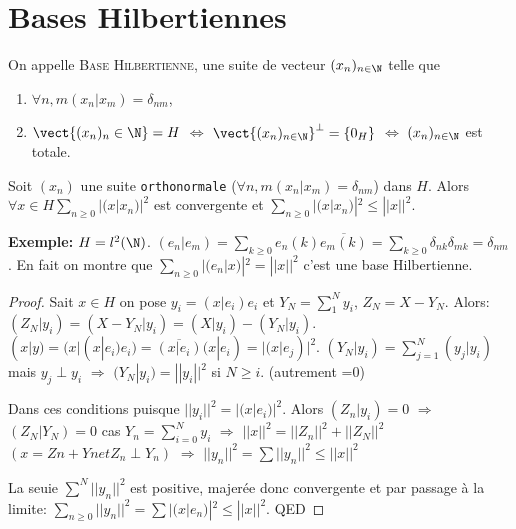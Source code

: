 \section{Bases Hilbertiennes} %

\begin{definition}
	On appelle \textsc{Base Hilbertienne}, une suite de vecteur $(x_n)_{n\in \N}$ telle que 
	\begin{enumerate}
		\item $\forall n, m (x_n|x_m)=δ_{nm}$,
		\item $\vect\{(x_n)_n\in\N\}=H$ $\Leftrightarrow$ $\vect{(x_n)_{n\in \N}}^\perp=\{0_H\}$ $\Leftrightarrow$ $(x_n)_{n\in \N}$ est totale.
	\end{enumerate}
\end{definition}

\begin{theorem}
	Soit $(x_n)$ une suite \texttt{orthonormale} ($\forall n, m (x_n|x_m)=δ_{nm}$) dans $H$. Alors $\forall x\in H ∑_{n≥0}|(x|x_n)|^2$ est convergente et $∑_{n≥0}|(x|x_n)|^2≤||x||^2$.
\end{theorem}

\textbf{Exemple:} $H=l^2(\N)$. $(e_n|e_m)=∑_{k≥0}e_n(k)\overline{e_m(k)}=∑_{k≥0}δ_{nk}δ_{mk}=δ_{nm}$. En fait on montre que $∑_{n≥0}|(e_n|x)|^2=||x||^2$ c'est une base Hilbertienne.
\begin{proof}
	Sait $x\in H$ on pose $y_i=(x|e_i)e_i$ et $Y_N=∑_1^Ny_i$, $Z_N=X-Y_N$. Alors: $(Z_N|y_i)=(X-Y_N|y_i)=(X|y_i)-(Y_N|y_i)$. $(x|y)=(x|(x|e_i)e_i)=\overline{(x|e_i)}(x|e_i)=|(x|e_j)|^2$. $(Y_N|y_i)=∑_{j=1}^N(y_j|y_i)$ mais $y_j\perp y_i$ $\Rightarrow$  $(Y_N|y_i) =||y_i||^2$ si $N≥i$.
	(autrement =0)

Dans ces conditions puisque $||y_i||^2=|(x|e_i)|^2$. Alors $(Z_n|y_i)=0$ $\Rightarrow$  $(Z_N|Y_N)=0$ cas $Y_n=∑_{i=0}^Ny_i$ $\Rightarrow$  $||x||^2=||Z_n||^2+||Z_N||^2$ $(x=Zn+Yn et Z_n\perp Y_n)$
$\Rightarrow$  $||y_n||^2=∑||y_n||^2≤||x||^2$

La seuie $∑^N||y_n||^2$ est positive, majerée donc convergente et par passage à la limite: $∑_{n≥0}||y_n||^2=∑|(x|e_n)|^2≤||x||^2$. QED

\end{proof}


